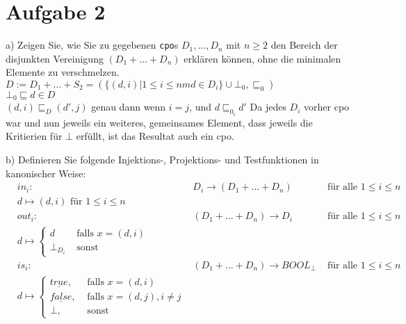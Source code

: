 \documentclass[ngerman,a4paper]{report}
\begin{document}
\section*{Aufgabe 2}
\begin{compactenum}
\item[a)] Zeigen Sie, wie Sie zu gegebenen \lstinline!cpo!s $D_1,...,D_n$ mit $n\geq 2$ den Bereich der disjunkten Vereinigung $(D_1 + ... + D_n)$ erklären können, ohne die minimalen Elemente zu verschmelzen.\\

	$D:= D_1+...+S_2 = (\lbrace (d,i)| 1\leq i \leq nm d \in D_i \rbrace \cup \bot_0, \sqsubseteq_0)$\\
	$\bot_0 \sqsubseteq d \in D$\\
	$(d,i) \sqsubseteq_D (d',j)$ genau dann wenn $ i=j$, und $ d\sqsubseteq_{0_i}d'$
Da jedes $D_i$ vorher cpo war und nun jeweils ein weiteres, gemeinsames Element, dass jeweils die Kritierien für $\bot$ erfüllt, ist das Resultat auch ein cpo.
\item[b)] Definieren Sie folgende Injektions-, Projektions- und Testfunktionen in kanonischer Weise:\\
%
%
	\begin{align*}
		&in_i:& D_i \rightarrow (D_1+...+D_n)& \text{ für alle } 1\leq i\leq n\\
		& d \mapsto (d,i) \text{ für } 1 \leq i \leq n\\
		&out_i:& (D_1+...+D_n)\rightarrow D_i& \text{ für alle } 1\leq i\leq n\\
		& d \mapsto \begin{cases} d & \text{ falls } x=(d,i)\\ \bot_{D_i} & \text{ sonst }\end{cases}&&\\
		&is_i:& (D_1+...+D_n)\rightarrow BOOL_\bot& \text{ für alle } 1\leq i\leq n\\
		& d \mapsto \begin{cases} \underline{true},& \text{ falls } x=(d,i)\\ \underline{false},& \text{ falls } x = (d,j), i \neq j\\ \bot,& \text{ sonst } \end{cases}&&
	\end{align*}


\end{compactenum}
\end{document}
